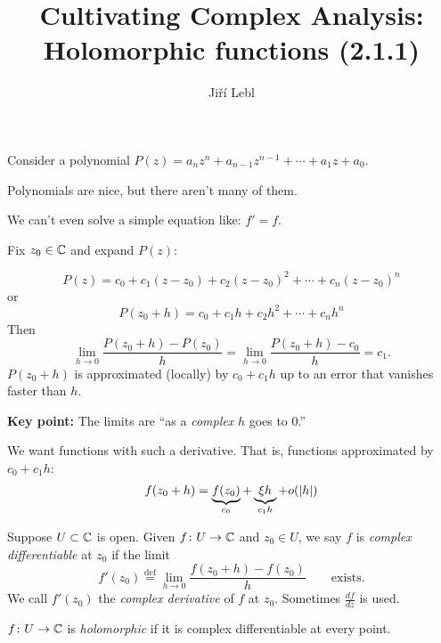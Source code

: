 \documentclass[10pt,aspectratio=169]{beamer}
\author{Ji\v{r}\'i Lebl}
\institute[OSU]{%
Departemento pri Matematiko de Oklahoma {\^S}tata Universitato}
\title{Cultivating Complex Analysis:\\%
Holomorphic functions (2.1.1)}
\date{}
\begin{document}
\begin{frame}
\titlepage
\end{frame}

\begin{frame}

\section{}
Consider a polynomial
$P(z) = a_n z^n + a_{n-1} z^{n-1} + \cdots + a_1 z + a_0$.

\medskip
\pause

Polynomials are nice, but there aren't many of them.

\medskip
\pause

We can't even solve a simple equation like: $f'=f$.

\medskip
\pause

Fix $z_0 \in {\mathbb{C}}$ and expand $P(z)$:

\[
P(z) = c_0 + c_1 (z-z_0) + c_2 {(z-z_0)}^2 + \cdots + c_n {(z-z_0)}^n
\]
\pause
or
\[
P(z_0+h) = c_0 + c_1 h + c_2 h^2 + \cdots + c_n h^n
\]
\pause
Then
\[
\lim_{h \to 0} \frac{P(z_0+h) - P(z_0)}{h} =
\lim_{h \to 0} \frac{P(z_0+h) - c_0}{h} = c_1 .
\]
\pause
$P(z_0+h)$ is approximated (locally) by $c_0 + c_1 h$
up to an error that vanishes faster than $h$.

\medskip
\pause

\textbf{Key point:} The limits are ``as a \emph{complex} $h$ goes to $0$.''

\end{frame}

\begin{frame}
We want functions with such a derivative.  That is, functions approximated
by $c_0 + c_1 h$:
\[
f(z_0+h) = \underbrace{f(z_0)}_{c_0} + \underbrace{\xi h}_{c_1 h} + o(\lvert {h} \rvert)
\]

\medskip
\pause

\begin{definition}
Suppose $U \subset {\mathbb{C}}$ is open.
Given $f \colon U \to {\mathbb{C}}$ and $z_0 \in U$, we say 
$f$ is \emph{complex differentiable} at $z_0$ if
the limit
\[
f'(z_0) \overset{\text{def}}{=}
\lim_{h \to 0} \frac{f(z_0+h) - f(z_0)}{h}
\qquad \text{exists.}
\]
\pause
We call $f'(z_0)$ the \emph{complex derivative} of $f$
at $z_0$.  Sometimes $\frac{df}{dz}$ is used.
\pause

$f \colon U \to {\mathbb{C}}$ is
\emph{holomorphic}
if it is complex differentiable at every point.
\end{definition}

\end{frame}
\end{document}
